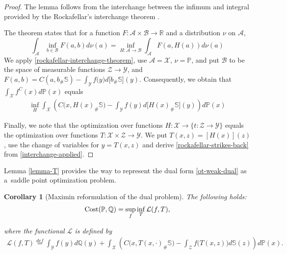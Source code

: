 \documentclass{article} %
\newtheorem{corollary}{Corollary}
\begin{document}
\vspace{-2mm}
\begin{proof}
The lemma follows from the interchange between the infimum and integral provided by the Rockafellar's interchange theorem \citep[Theorem 3A]{rockafellar1976integral}.

The theorem states that for a function $F:\mathcal{A}\times\mathcal{B}\rightarrow\mathbb{R}$ and a distribution $\nu$ on $\mathcal{A}$, 
\begin{equation}
    \int_{\mathcal{A}}\inf_{b\in\mathcal{B}}F(a,b)d\nu(a)\!=\!\inf_{H:\mathcal{A}\rightarrow\mathcal{B}}\!\int_{\mathcal{A}}F(a,H(a))d\nu(a)
    \label{rockafellar-interchange-theorem}
\end{equation}
We apply \eqref{rockafellar-interchange-theorem}, use $\mathcal{A}=\mathcal{X}$, $\nu=\mathbb{P}$, 
and put $\mathcal{B}$ to be the space of measurable functions $\mathcal{Z}\rightarrow\mathcal{Y}$, and
$F(a,b)=C(a,b_{\#}\mathbb{S})\!-\!\int_{\mathcal{Y}}f\big(y\big)d\big[b_{\#}\mathbb{S}\big](y).$ Consequently, we obtain that $\int_{\mathcal{X}}f^{C}(x)d\mathbb{P}(x)$ equals
\begin{eqnarray}
    \inf_{H}\!\int_{\mathcal{X}}\!\left(\! C\big(x,H(x)_{\#}\mathbb{S}\big)\!-\!\int_{\mathcal{Y}}f(y) d\big[H(x)_{\#}\mathbb{S}](y)\!\right)\! d\mathbb{P}(x)
    \label{interchange-applied}
\end{eqnarray}

\vspace{-1.5mm}Finally, we note that the optimization over functions
$H:\mathcal{X}\rightarrow\{t:\mathcal{Z}\rightarrow\mathcal{Y}\}$ equals the optimization over functions ${T:\mathcal{X}\times\mathcal{Z}\rightarrow\mathcal{Y}}$. We put $T(x,z)\!=\![H(x)](z)$, use the change of variables for $y=T(x,z)$ and derive \eqref{rockafellar-strikes-back} from \eqref{interchange-applied}.
\end{proof}

\vspace{-1mm}Lemma \ref{lemma-T} provides the way to represent the dual form \eqref{ot-weak-dual} as a~saddle point optimization problem. 

\begin{corollary}[Maximin reformulation of the dual problem]The following holds:\vspace{-1mm}
\begin{eqnarray} 
    \text{\normalfont Cost}(\mathbb{P},\mathbb{Q})=\sup_{f}\inf_{T}\mathcal{L}(f,T),
    \label{main-objective}
\end{eqnarray}

\vspace{-3mm}where the functional $\mathcal{L}$ is defined by\vspace{-1mm}
\begin{eqnarray}
    \mathcal{L}(f,T)\stackrel{def}{=}\int_{\mathcal{Y}}f(y)d\mathbb{Q}(y)+
    \int_{\mathcal{X}}\!\left(\! C\big(x,T(x,\cdot)_{\#}\mathbb{S}\big)\!-\!\int_{\mathcal{Z}}f\big(T(x,z)\big) d\mathbb{S}(z)\!\right)\! d\mathbb{P}(x).
    \label{L-def}
\end{eqnarray}
\end{corollary}
\end{document}
